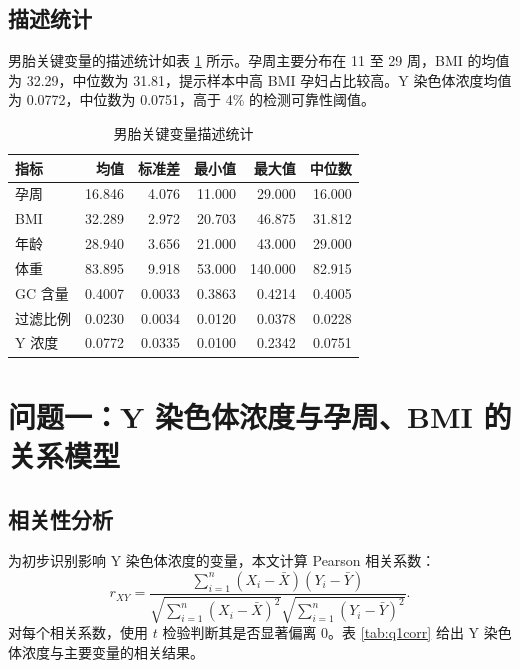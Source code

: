 \documentclass[UTF8,zihao=-4]{ctexart}
\numberwithin{equation}{section}
\begin{document}
\subsection{描述统计}

男胎关键变量的描述统计如表 \ref{tab:desc} 所示。孕周主要分布在 11 至 29 周，BMI 的均值为 32.29，中位数为 31.81，提示样本中高 BMI 孕妇占比较高。Y 染色体浓度均值为 0.0772，中位数为 0.0751，高于 4\% 的检测可靠性阈值。

\begin{table}[H]
\centering
\caption{男胎关键变量描述统计}
\label{tab:desc}
\begin{tabular}{lrrrrr}
\toprule
指标 & 均值 & 标准差 & 最小值 & 最大值 & 中位数 \\
\midrule
孕周 & 16.846 & 4.076 & 11.000 & 29.000 & 16.000 \\
BMI & 32.289 & 2.972 & 20.703 & 46.875 & 31.812 \\
年龄 & 28.940 & 3.656 & 21.000 & 43.000 & 29.000 \\
体重 & 83.895 & 9.918 & 53.000 & 140.000 & 82.915 \\
GC 含量 & 0.4007 & 0.0033 & 0.3863 & 0.4214 & 0.4005 \\
过滤比例 & 0.0230 & 0.0034 & 0.0120 & 0.0378 & 0.0228 \\
Y 浓度 & 0.0772 & 0.0335 & 0.0100 & 0.2342 & 0.0751 \\
\bottomrule
\end{tabular}
\end{table}

\section{问题一：Y 染色体浓度与孕周、BMI 的关系模型}

\subsection{相关性分析}

为初步识别影响 Y 染色体浓度的变量，本文计算 Pearson 相关系数：
\begin{equation}
r_{XY}=
\frac{\sum_{i=1}^{n}(X_i-\bar{X})(Y_i-\bar{Y})}
{\sqrt{\sum_{i=1}^{n}(X_i-\bar{X})^2}\sqrt{\sum_{i=1}^{n}(Y_i-\bar{Y})^2}}.
\end{equation}
对每个相关系数，使用 $t$ 检验判断其是否显著偏离 0。表 \ref{tab:q1corr} 给出 Y 染色体浓度与主要变量的相关结果。
\end{document}
